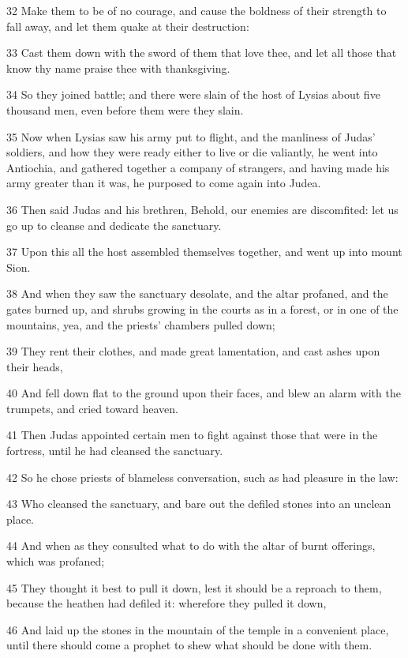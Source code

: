 \par 32 Make them to be of no courage, and cause the boldness of their strength to fall away, and let them quake at their destruction:
\par 33 Cast them down with the sword of them that love thee, and let all those that know thy name praise thee with thanksgiving.
\par 34 So they joined battle; and there were slain of the host of Lysias about five thousand men, even before them were they slain.
\par 35 Now when Lysias saw his army put to flight, and the manliness of Judas' soldiers, and how they were ready either to live or die valiantly, he went into Antiochia, and gathered together a company of strangers, and having made his army greater than it was, he purposed to come again into Judea.
\par 36 Then said Judas and his brethren, Behold, our enemies are discomfited: let us go up to cleanse and dedicate the sanctuary.
\par 37 Upon this all the host assembled themselves together, and went up into mount Sion.
\par 38 And when they saw the sanctuary desolate, and the altar profaned, and the gates burned up, and shrubs growing in the courts as in a forest, or in one of the mountains, yea, and the priests' chambers pulled down;
\par 39 They rent their clothes, and made great lamentation, and cast ashes upon their heads,
\par 40 And fell down flat to the ground upon their faces, and blew an alarm with the trumpets, and cried toward heaven.
\par 41 Then Judas appointed certain men to fight against those that were in the fortress, until he had cleansed the sanctuary.
\par 42 So he chose priests of blameless conversation, such as had pleasure in the law:
\par 43 Who cleansed the sanctuary, and bare out the defiled stones into an unclean place.
\par 44 And when as they consulted what to do with the altar of burnt offerings, which was profaned;
\par 45 They thought it best to pull it down, lest it should be a reproach to them, because the heathen had defiled it: wherefore they pulled it down,
\par 46 And laid up the stones in the mountain of the temple in a convenient place, until there should come a prophet to shew what should be done with them.
